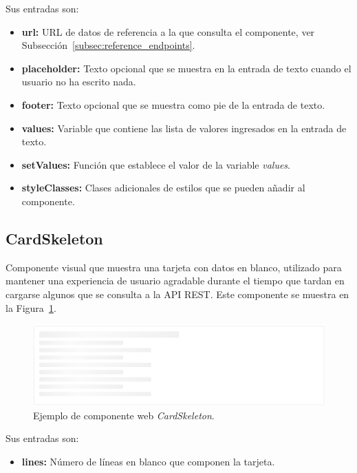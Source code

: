 \documentclass[a4paper, 12pt]{book}
\begin{document}
    Sus entradas son:

    \begin{itemize}
        \item \textbf{url:} URL de datos de referencia a la que consulta el componente, ver Subsección~\ref{subsec:reference_endpoints}.
        \item \textbf{placeholder:} Texto opcional que se muestra en la entrada de texto cuando el usuario no ha escrito nada.
        \item \textbf{footer:} Texto opcional que se muestra como pie de la entrada de texto.
        \item \textbf{values:} Variable que contiene las lista de valores ingresados en la entrada de texto.
        \item \textbf{setValues:} Función que establece el valor de la variable \emph{values}.
        \item \textbf{styleClasses:} Clases adicionales de estilos que se pueden añadir al componente.
    \end{itemize}

    \subsection{CardSkeleton}
    \label{subsec:wc_card_skeleton}
    Componente visual que muestra una tarjeta con datos en blanco, utilizado para mantener una experiencia de usuario agradable durante el tiempo que tardan en cargarse algunos que se consulta a la API REST.
    Este componente se muestra en la Figura~\ref{fig:component_card_skeleton}.

    \begin{figure}
        \centering
        \includegraphics[width=15cm, keepaspectratio]{img/CardSkeleton.PNG}
        \caption{Ejemplo de componente web \emph{CardSkeleton}.}\label{fig:component_card_skeleton}
    \end{figure}

    Sus entradas son:

    \begin{itemize}
        \item \textbf{lines:} Número de líneas en blanco que componen la tarjeta.
    \end{itemize}
\end{document}
